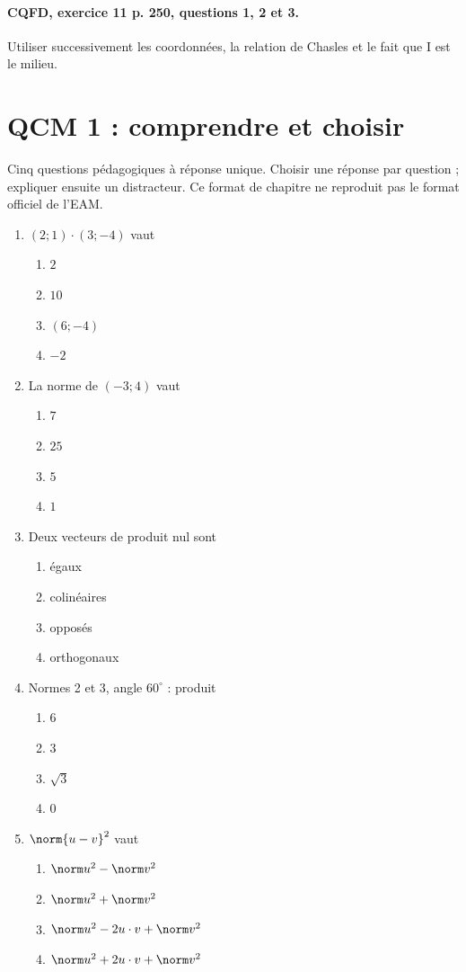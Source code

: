 \paragraph{CQFD, exercice 11 p. 250, questions 1, 2 et 3.}\label{C03-M2} Utiliser successivement les coordonnées, la relation de Chasles et le fait que I est le milieu.
\begingroup\small
\clearpage\section*{QCM 1 : comprendre et choisir}\label{C03-Q1}
Cinq questions pédagogiques à réponse unique. Choisir une réponse par question ; expliquer ensuite un distracteur. Ce format de chapitre ne reproduit pas le format officiel de l’EAM.
\begin{enumerate}
\item $(2;1)\cdot(3;-4)$ vaut
\begin{enumerate}[label=\Alph*.,itemsep=2pt]
\item $2$
\item $10$
\item $(6;-4)$
\item $-2$
\end{enumerate}
\item La norme de $(-3;4)$ vaut
\begin{enumerate}[label=\Alph*.,itemsep=2pt]
\item $7$
\item $25$
\item $5$
\item $1$
\end{enumerate}
\item Deux vecteurs de produit nul sont
\begin{enumerate}[label=\Alph*.,itemsep=2pt]
\item égaux
\item colinéaires
\item opposés
\item orthogonaux
\end{enumerate}
\item Normes 2 et 3, angle $60^\circ$ : produit
\begin{enumerate}[label=\Alph*.,itemsep=2pt]
\item $6$
\item $3$
\item $\sqrt3$
\item $0$
\end{enumerate}
\item $\norm{u-v}^2$ vaut
\begin{enumerate}[label=\Alph*.,itemsep=2pt]
\item $\norm u^2-\norm v^2$
\item $\norm u^2+\norm v^2$
\item $\norm u^2-2u\cdot v+\norm v^2$
\item $\norm u^2+2u\cdot v+\norm v^2$
\end{enumerate}
\end{enumerate}
